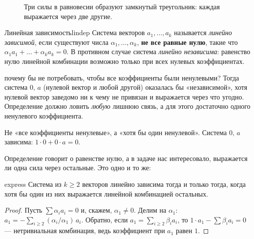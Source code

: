 \documentclass[12pt,a4paper]{report}
\begin{document}
\begin{figure}[h]\centering
{}
\caption{Три силы в равновесии образуют замкнутый треугольник:
каждая выражается через две другие.}
\end{figure}

\begin{definition}{Линейная зависимость}{lindep}
Система векторов $a_1,\dots,a_k$ называется \emph{линейно зависимой},
если существуют числа $\alpha_1,\dots,\alpha_k$, \textbf{не все равные нулю},
такие что $\alpha_1a_1+\dots+\alpha_ka_k=0$. В противном случае система
\emph{линейно независима}: равенство нулю линейной комбинации возможно
только при всех нулевых коэффициентах.
\end{definition}

\begin{studentq}{почему бы не потребовать, чтобы все коэффициенты были ненулевыми?}
Тогда система $0,\,a$ (нулевой вектор и любой другой) оказалась бы «независимой»,
хотя нулевой вектор заведомо ни к чему не привязан и выражается через что угодно.
Определение должно ловить \emph{любую} лишнюю связь, а для этого достаточно
одного ненулевого коэффициента.
\end{studentq}

\begin{trap}
Не «все коэффициенты ненулевые», а «хотя бы один ненулевой».
Система $0,\,a$ зависима: $1\cdot 0+0\cdot a=0$.
\end{trap}

Определение говорит о равенстве нулю, а в задаче нас интересовало,
выражается ли одна сила через остальные. Это одно и то же:

\begin{lemma}{}{express}
Система из $k\ge2$ векторов линейно зависима тогда и только тогда,
когда хотя бы один из них выражается линейной комбинацией остальных.
\end{lemma}
\begin{proof}
Пусть $\sum\alpha_ia_i=0$ и, скажем, $\alpha_1\neq0$. Делим на $\alpha_1$:
$a_1=-\sum_{i\ge2}(\alpha_i/\alpha_1)\,a_i$. Обратно, если
$a_1=\sum_{i\ge2}\beta_ia_i$, то $1\cdot a_1-\sum\beta_ia_i=0$ — нетривиальная
комбинация, ведь коэффициент при $a_1$ равен $1$.
\end{proof}
\end{document}
